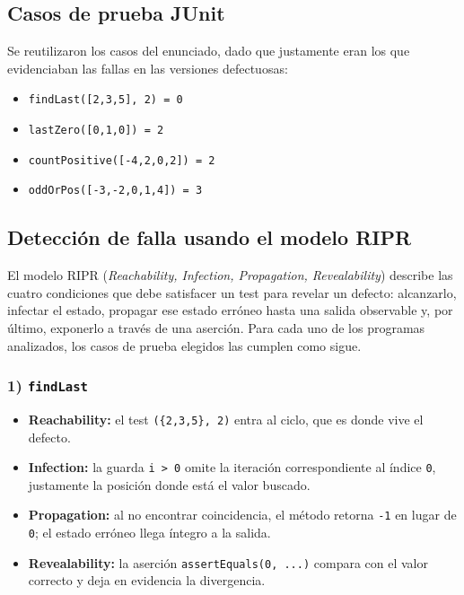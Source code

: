 \documentclass[12pt,a4paper]{article}
\begin{document}
\subsection{Casos de prueba JUnit}
Se reutilizaron los casos del enunciado, dado que justamente eran los que evidenciaban las fallas en las versiones defectuosas:
\begin{itemize}
  \item \texttt{findLast([2,3,5], 2) = 0}
  \item \texttt{lastZero([0,1,0]) = 2}
  \item \texttt{countPositive([-4,2,0,2]) = 2}
  \item \texttt{oddOrPos([-3,-2,0,1,4]) = 3}
\end{itemize}

\subsection{Detección de falla usando el modelo RIPR}
El modelo RIPR (\textit{Reachability, Infection, Propagation, Revealability}) describe las cuatro condiciones que debe satisfacer un test para revelar un defecto: alcanzarlo, infectar el estado, propagar ese estado erróneo hasta una salida observable y, por último, exponerlo a través de una aserción. Para cada uno de los programas analizados, los casos de prueba elegidos las cumplen como sigue.

\subsubsection*{1) \texttt{findLast}}
\begin{itemize}
  \item \textbf{Reachability:} el test \texttt{(\{2,3,5\}, 2)} entra al ciclo, que es donde vive el defecto.
  \item \textbf{Infection:} la guarda \texttt{i > 0} omite la iteración correspondiente al índice \texttt{0}, justamente la posición donde está el valor buscado.
  \item \textbf{Propagation:} al no encontrar coincidencia, el método retorna \texttt{-1} en lugar de \texttt{0}; el estado erróneo llega íntegro a la salida.
  \item \textbf{Revealability:} la aserción \texttt{assertEquals(0, ...)} compara con el valor correcto y deja en evidencia la divergencia.
\end{itemize}
\end{document}
